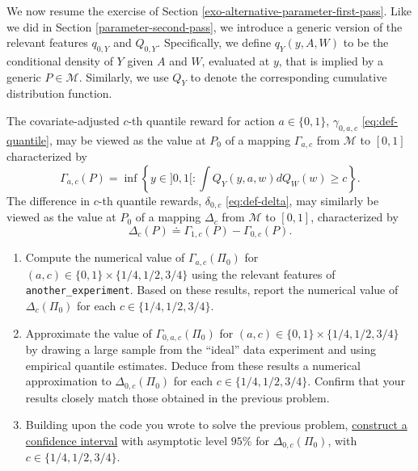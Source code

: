 \documentclass[11pt,openright,twoside]{book}
\newcommand{\defq}{\doteq}
\newcommand{\calM}{\mathcal{M}}
\theoremstyle{definition}
\theoremstyle{definition}
\theoremstyle{definition}
\theoremstyle{remark}
\begin{document}
We now resume the exercise of Section
\ref{exo-alternative-parameter-first-pass}. Like we did in Section
\ref{parameter-second-pass}, we introduce a generic version of the relevant
features \(q_{0,Y}\) and \(Q_{0,Y}\). Specifically, we define \(q_{Y}(y,A,W)\) to
be the conditional density of \(Y\) given \(A\) and \(W\), evaluated at \(y\), that is
implied by a generic \(P \in \calM\). Similarly, we use \(Q_{Y}\) to denote the
corresponding cumulative distribution function.

The covariate-adjusted \(c\)-th quantile reward for action \(a \in \{0,1\}\),
\(\gamma_{0,a,c}\) \eqref{eq:def-quantile}, may be viewed as the value at \(P_{0}\)
of a mapping \(\Gamma_{a,c}\) from \(\calM\) to \([0,1]\) characterized by
\begin{equation*} \Gamma_{a,c}(P) = \inf\left\{y \in ]0,1[ : \int Q_{Y}(y,a,w)
dQ_W(w) \ge  c \right\}.   \end{equation*} The difference in \(c\)-th quantile
rewards, \(\delta_{0,c}\) \eqref{eq:def-delta}, may similarly be viewed as the
value at \(P_{0}\) of a mapping \(\Delta_c\) from \(\calM\) to \([0,1]\),
characterized by \begin{equation*}   \Delta_c(P)  \defq  \Gamma_{1,c}(P)  -
\Gamma_{0,c}(P).  \end{equation*}

\begin{enumerate}
\def\labelenumi{\arabic{enumi}.}
\item
  Compute the numerical value of \(\Gamma_{a,c}(\Pi_0)\) for \((a,c) \in \{0,1\} \times \{1/4, 1/2, 3/4\}\) using the relevant features of
  \texttt{another\_experiment}. Based on these results, report the numerical value
  of \(\Delta_c(\Pi_0)\) for each \(c \in \{1/4, 1/2, 3/4\}\).
\item
  Approximate the value of \(\Gamma_{0,a,c}(\Pi_{0})\) for \((a,c) \in \{0,1\} \times \{1/4, 1/2, 3/4\}\) by drawing a large sample from the ``ideal'' data
  experiment and using empirical quantile estimates. Deduce from these
  results a numerical approximation to \(\Delta_{0,c} (\Pi_{0})\) for each \(c \in \{1/4, 1/2, 3/4\}\). Confirm that your results closely match those
  obtained in the previous problem.
\item
  Building upon the code you wrote to solve the previous problem, \protect\hyperlink{order}{construct
  a confidence interval} with asymptotic level
  \(95\%\) for \(\Delta_{0,c} (\Pi_{0})\), with \(c \in \{1/4, 1/2, 3/4\}\).
\end{enumerate}
\end{document}
